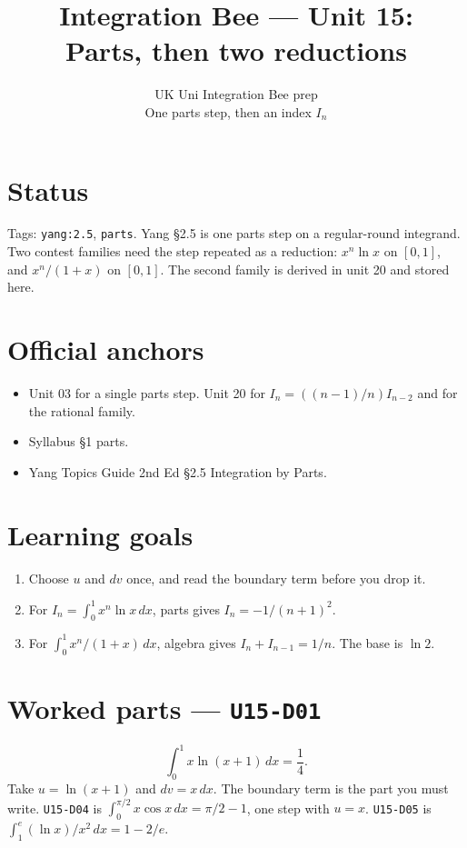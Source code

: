
\title{Integration Bee --- Unit 15:\\ Parts, then two reductions}
\author{UK Uni Integration Bee prep\\ One parts step, then an index $I_n$}
\date{}

\maketitle
\section*{Status}
Tags: \texttt{yang:2.5}, \texttt{parts}.
Yang \S2.5 is one parts step on a regular-round integrand. Two contest families need the step repeated as a reduction: $x^n\ln x$ on $[0,1]$, and $x^n/(1+x)$ on $[0,1]$. The second family is derived in unit 20 and stored here.
\section{Official anchors}
\begin{itemize}
  \item Unit 03 for a single parts step. Unit 20 for $I_n=((n-1)/n)I_{n-2}$ and for the rational family.
  \item Syllabus §1 parts.
  \item Yang Topics Guide 2nd Ed §2.5 Integration by Parts.
\end{itemize}
\section{Learning goals}
\begin{enumerate}
  \item Choose $u$ and $dv$ once, and read the boundary term before you drop it.
  \item For $I_n=\int_0^1 x^n\ln x\,dx$, parts gives $I_n=-1/(n+1)^2$.
  \item For $\int_0^1 x^n/(1+x)\,dx$, algebra gives $I_n+I_{n-1}=1/n$. The base is $\ln 2$.
\end{enumerate}

\section{Worked parts --- \texttt{U15-D01}}
\[
\int_0^1 x\ln(x+1)\,dx=\frac14.
\]
Take $u=\ln(x+1)$ and $dv=x\,dx$. The boundary term is the part you must write. \texttt{U15-D04} is $\int_0^{\pi/2}x\cos x\,dx=\pi/2-1$, one step with $u=x$. \texttt{U15-D05} is $\int_1^e(\ln x)/x^2\,dx=1-2/e$.


